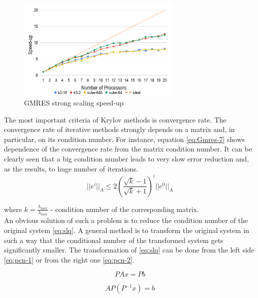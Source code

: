 \figpointer{\ref{fig:gmres-strong-scaling-speed-up}}
\begin{figure}[htpb]
  \centering
  \includegraphics[width=0.7\textwidth]{figures/chapter-2/gmres-strong-scaling-speedup.png}
\caption{GMRES strong scaling speed-up}
\label{fig:gmres-strong-scaling-speed-up}
\end{figure}



The most important criteria of Krylov methods is convergence rate. The convergence rate of iterative methods strongly depends on a matrix and, in particular, on its condition number. For instance, equation \ref{eq:Gmres-7} shows dependence of the convergence rate from the matrix condition number. It can be clearly seen that a big condition number leads to very slow error reduction and, as the results, to huge number of iterations.\\

\begin{equation} \label{eq:Gmres-7}
	|| e^i ||_A \leq 2 ( \frac{\sqrt k - 1}{\sqrt k + 1} )^i || e^0 ||_A
\end{equation}

where $k = \frac{\lambda_{max}}{\lambda_{min}}$ - condition number of the corresponding matrix. \\

An obvious solution of such a problem is to reduce the condition number of the original system \ref{eq:slq}. A general method is to transform the original system in such a way that the conditional number of the transformed system gets significantly smaller. The transformation of \ref{eq:slq} can be done from the left side \ref{eq:pcn-1} or from the right one \ref{eq:pcn-2}.

\begin{equation} \label{eq:pcn-1}
	PAx = Pb
\end{equation}


\begin{equation} \label{eq:pcn-2}
	AP(P^{-1}x) = b
\end{equation}


